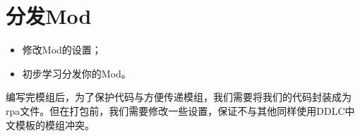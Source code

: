 \documentclass[../../Main.tex]{subfiles}
\begin{document}
\chapter{分发Mod}

\begin{ChapterGoals}
    \begin{itemize}
        \item 修改Mod的设置；
        \item 初步学习分发你的Mod。
    \end{itemize}
\end{ChapterGoals}

编写完模组后，为了保护代码与方便传递模组，我们需要将我们的代码封装成为rpa文件。但在打包前，我们需要修改一些设置，保证不与其他同样使用DDLC中文模板的模组冲突。



\end{document}
